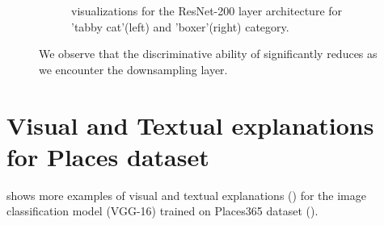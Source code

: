 \begin{figure}
\begin{subfigure}[t]{0.49\textwidth}
\begin{center}
     \caption{\gcam{}  visualizations for the ResNet-200 layer architecture for 'tabby cat'(left) and 'boxer'(right) category.}
        \end{center}
    \end{subfigure}
    \vspace{18pt}
    \caption{We observe that the discriminative ability of \gcam{} significantly reduces as we encounter the downsampling layer.}
     \label{fig:sup_resnet}
\end{figure}


\vspace{-10pt}
\section{Visual and Textual explanations for Places dataset}\label{sec:sup_text_exp}
\vspace{-15pt}
 shows more examples of visual and textual explanations () for the image classification model (VGG-16) trained on Places365 dataset (\cite{zhou2017places}).



